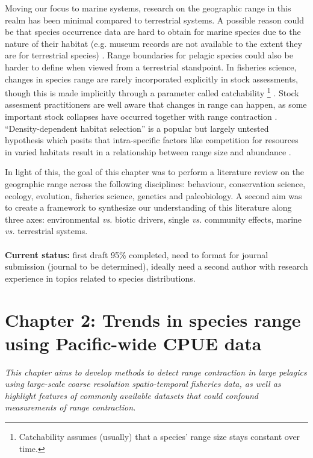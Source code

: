 \documentclass{article}
\begin{document}
Moving our focus to marine systems, research on the geographic range
in this realm has been minimal compared to terrestrial
systems. A possible reason could be that species occurrence data are
hard to obtain for marine
species due to the nature of their habitat (e.g. museum
records are not available to the extent they are for terrestrial
species) \citep[see][]{Tyberghein2012_a}. Range boundaries for
pelagic species could also be harder to define when viewed from a
 terrestrial standpoint. In fisheries science, changes in species range
 are rarely incorporated explicitly in stock assessments, though this
 is made implicitly through a parameter called catchability
 \footnote{Catchability assumes (usually) that a species' range size stays constant
over time.} \citep{Winters1985_a}. Stock assesment practitioners are
well aware that changes in range can happen, as some
important stock collapses have occurred together with range contraction
\citep[][]{Rose1999_a}.
``Density-dependent habitat selection'' is a popular but largely untested
hypothesis \citep{MacCall1990_a} which posits that intra-specific factors like
competition for resources in varied habitats result in a relationship between
range size and abundance \citep[but see][]{Shepherd2004_a}.

In light of this, the goal of this chapter was to perform a
literature review on the geographic range across the following
disciplines: behaviour, conservation science, ecology, evolution,
fisheries science, genetics and paleobiology. A second aim was to
create a framework to synthesize our understanding of this
literature along three axes: environmental \emph{vs.} biotic
drivers, single \emph{vs.} community effects, marine \emph{vs.}
terrestrial systems.\\
\\
\textbf{Current status:} first draft 95\% completed, need to format for
journal submission (journal to be determined), ideally need a second
author with research experience in topics related to species
distributions.


\clearpage
\section*{Chapter 2: Trends in species range using Pacific-wide CPUE
  data}
\addtocounter{section}{1}
\emph{This chapter aims to develop methods to detect range contraction
  in large pelagics using large-scale coarse resolution spatio-temporal fisheries data,
  as well as highlight features of commonly available datasets that
  could confound measurements of range contraction.}\\
\end{document}
